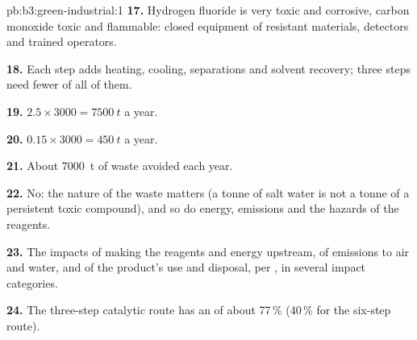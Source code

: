 \begin{solution}{pb:b3:green-industrial:1}
\textbf{17.} Hydrogen fluoride is very toxic and corrosive, carbon monoxide toxic and
flammable: closed equipment of resistant materials, detectors and trained
operators.

\textbf{18.} Each step adds heating, cooling, separations and solvent recovery; three
steps need fewer of all of them.

\textbf{19.} $2.5 \times 3000 = \qty{7500}{t}$ a year.

\textbf{20.} $0.15 \times 3000 = \qty{450}{t}$ a year.

\textbf{21.} About \qty{7000}{t} of waste avoided each year.

\textbf{22.} No: the nature of the waste matters (a tonne of salt water is not a tonne of
a persistent toxic compound), and so do energy, emissions and the hazards of the
reagents.

\textbf{23.} The impacts of making the reagents and energy upstream, of emissions to
air and water, and of the product's use and disposal, per , in
several impact categories.

\textbf{24.} The three-step catalytic route has an  of about 77\,\% (40\,\% for the
six-step route).
\end{solution}
